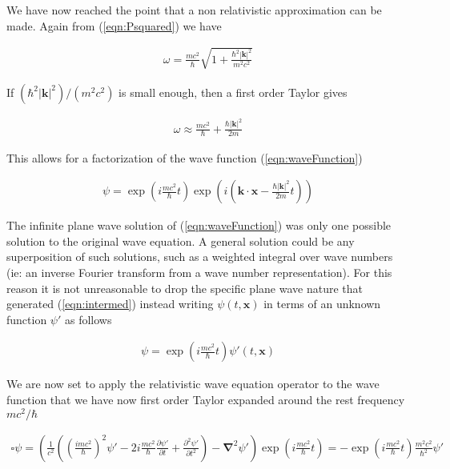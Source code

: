 \documentclass[]{eliblog}
\newcommand{\Abs}[1]{{\left\lvert{#1}\right\rvert}}
\newcommand{\Bk}[0]{\mathbf{k}}
\newcommand{\Bx}[0]{\mathbf{x}}
\newcommand{\spacegrad}[0]{\boldsymbol{\nabla}}
\newcommand{\delambertian}[0]{\square}
\begin{document}
We have now reached the point that a non relativistic approximation can be made.
Again from (\ref{eqn:Psquared}) we have

\begin{align}
\omega = \frac{m c^2}{\hbar} \sqrt{ 1 + \frac{\hbar^2 \Abs{\Bk}^2}{m^2 c^2}}
\end{align}

If $(\hbar^2 \Abs{\Bk}^2)/(m^2 c^2)$ is small enough, then a first order Taylor gives

\begin{align}
\omega \approx \frac{m c^2}{\hbar} + \frac{\hbar \Abs{\Bk}^2}{2 m}
\end{align}

This allows for a factorization of the wave function (\ref{eqn:waveFunction})

\begin{align}\label{eqn:intermed}
\psi = 
\exp\left( i \frac{m c^2}{\hbar} t \right) 
\exp\left( i \left( 
\Bk \cdot \Bx 
-\frac{\hbar \Abs{\Bk}^2}{2 m}t 
\right) \right)
\end{align}

The infinite plane wave solution of (\ref{eqn:waveFunction}) was only one possible solution to the original wave equation.
A general solution could be any superposition of such solutions, such as a weighted integral over wave numbers (ie: an 
inverse Fourier transform from a wave number representation).  For this reason it is not unreasonable to drop the specific
plane wave nature that generated (\ref{eqn:intermed}) instead writing $\psi(t,\Bx)$ in terms of an unknown function $\psi'$ as follows

\begin{align}
\psi = \exp\left( i \frac{m c^2}{\hbar} t \right) \psi'(t, \Bx)
\end{align}

We are now set to apply the relativistic wave equation operator to the wave function that we have now first order Taylor expanded
around the rest frequency $m c^2/\hbar$

\begin{align}
\delambertian \psi 
= 
\left(
\frac{1}{c^2} 
\left( 
\left( \frac{i m c^2}{\hbar} \right)^2 \psi' - 2 i \frac{m c^2}{\hbar} \frac{\partial \psi'}{\partial t} + 
\frac{\partial^2 \psi'}{\partial t^2} 
\right) 
-
\spacegrad^2 \psi' 
\right)
\exp\left( i \frac{m c^2}{\hbar} t \right) 
= - 
\exp\left( i \frac{m c^2}{\hbar} t \right) 
\frac{m^2 c^2}{\hbar^2} \psi'
\end{align}
\end{document}
